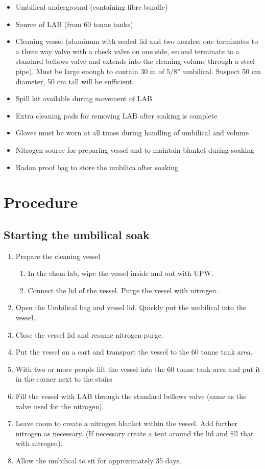 \begin{itemize}
\item Umbilical underground (containing fibre bundle)
\item Source of LAB (from 60 tonne tanks)
\item Cleaning vessel (aluminum with sealed lid and two nozzles; one terminates to a three way valve with a check valve on one side, second terminate to a standard bellows valve and extends into the cleaning volume through a steel pipe). Must be large enough to contain 30 m of 5/8'' umbilical. Suspect 50 cm diameter, 50 cm tall will be sufficient.
\item Spill kit available during movement of LAB
\item Extra cleaning pads for removing LAB after soaking is complete
\item Gloves must be worn at all times during handling of umbilical and volume
\item Nitrogen source for preparing vessel and to maintain blanket during soaking
\item Radon proof bag to store the umbilica after soaking
\end{itemize}

\section{Procedure}
\subsection{Starting the umbilical soak}
\begin{enumerate}
\item Prepare the cleaning vessel
  \begin{enumerate}
  \item In the chem lab, wipe the vessel inside and out with UPW. 
  \item Connect the lid of the vessel. Purge the vessel with nitrogen.
  \end{enumerate}
\item Open the Umbilical bag and vessel lid. Quickly put the umbilical into the vessel.
\item Close the vessel lid and resume nitrogen purge.
\item Put the vessel on a cart and transport the vessel to the 60 tonne tank area.
\item With two or more people lift the vessel into the 60 tonne tank area and put it in the corner next to the stairs
\item Fill the vessel with LAB through the standard bellows valve (same as the valve used for the nitrogen).
\item Leave room to create a nitrogen blanket within the vessel. Add further nitrogen as necessary. (If necessary create a tent around the lid and fill that with nitrogen).
\item Allow the umbilical to sit for approximately 35 days.
\end{enumerate}  

